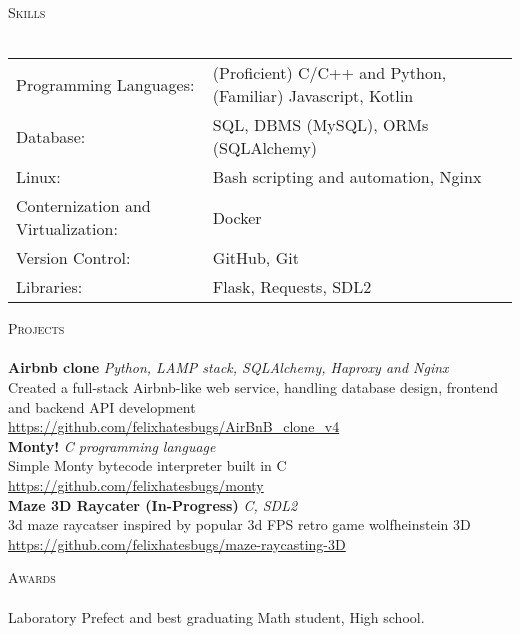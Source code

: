\documentclass[a4paper]{article}
\newcommand{\lineunder} {
    \vspace*{-8pt} \\
    \hspace*{-18pt} \hrulefill \\
}
\newcommand{\header} [1] {
    {\hspace*{-18pt}\vspace*{6pt} \textsc{#1}}
    \vspace*{-6pt} \lineunder
}
\begin{document}
\header{Skills}
\begin{tabular}{ l l }
	Programming Languages:             & (Proficient) C/C++ and Python, (Familiar) Javascript, Kotlin \\
	Database:                          & SQL, DBMS (MySQL), ORMs (SQLAlchemy)                     \\
	Linux:                             & Bash scripting and automation, Nginx                     \\
	Conternization and Virtualization: & Docker                                                   \\
	Version Control:                   & GitHub, Git                                              \\
	Libraries:                         & Flask, Requests, SDL2                                    \\
\end{tabular}
\vspace{2mm}

\header{Projects}
{\textbf{Airbnb clone}} {\sl Python, LAMP stack, SQLAlchemy, Haproxy and Nginx} \\
Created a full-stack Airbnb-like web service, handling database design, frontend and backend API development\\
\url{https://github.com/felixhatesbugs/AirBnB_clone_v4} \\
\vspace*{2mm}
{\textbf{Monty!}} {\sl C programming language} \\
Simple Monty bytecode interpreter built in C\\
\url{https://github.com/felixhatesbugs/monty} \\
\vspace*{2mm}
{\textbf{Maze 3D Raycater (In-Progress)}} {\sl C, SDL2} \\
3d maze raycatser inspired by popular 3d FPS retro game wolfheinstein 3D\\
\url{https://github.com/felixhatesbugs/maze-raycasting-3D} \\
\vspace*{2mm}

\header{Awards}
Laboratory Prefect and best graduating Math student, High school.\\
\vspace*{2mm}

\ 
\end{document}
